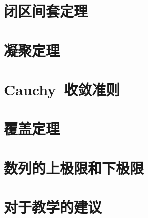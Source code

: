 \documentclass[UTF8,a4paper,10pt,twoside]{book}
\begin{document}
\section{闭区间套定理}

\section{凝聚定理}

\section{Cauchy~收敛准则}

\section{覆盖定理}

\section{数列的上极限和下极限}

\section{对于教学的建议}
\end{document}
